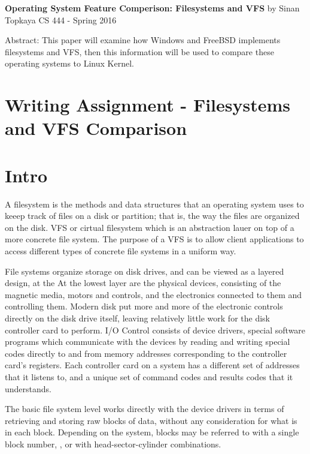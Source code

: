 \documentclass[letterpaper,10pt,draftclsnofoot,onecolumn]{IEEEtran}
\begin{document}
	\begin{titlepage}
		
		\begin{center}
		\bigbreak	
		\textbf{Operating System Feature Comperison: Filesystems and VFS}
		\bigbreak
		by Sinan Topkaya
		\smallbreak
		CS 444 - Spring 2016
		\end{center}
		\vfill
		
		Abstract: This paper will examine how Windows and FreeBSD implements filesystems and VFS, then this information will be used to compare these operating systems to Linux Kernel.
	\end{titlepage}

\section*{Writing Assignment - Filesystems and VFS Comparison}
\section*{Intro}

A filesystem is the methods and data structures that an operating system uses to keeep track of files on a disk or partition; that is, the way the files are organized on the disk. VFS or cirtual filesystem which is an abstraction lauer on top of a more concrete file system. The purpose of a VFS is to allow client applications to access different types of concrete file systems in a uniform way.
 
File systems organize storage on disk drives, and can be viewed as a layered design, at the At the lowest layer are the physical devices, consisting of the magnetic media, motors and controls, and the electronics connected to them and controlling them. Modern disk put more and more of the electronic controls directly on the disk drive itself, leaving relatively little work for the disk controller card to perform. I/O Control consists of device drivers, special software programs which communicate with the devices by reading and writing special codes directly to and from memory addresses corresponding to the controller card's registers. Each controller card on a system has a different set of addresses that it listens to, and a unique set of command codes and results codes that it understands.

The basic file system level works directly with the device drivers in terms of retrieving and storing raw blocks of data, without any consideration for what is in each block. Depending on the system, blocks may be referred to with a single block number, , or with head-sector-cylinder combinations.
\end{document}
